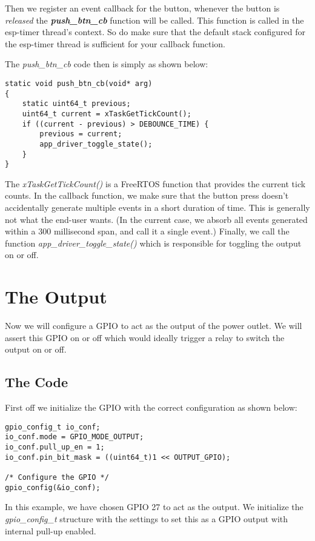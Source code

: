 \documentclass[main.tex]{subfiles}
\begin{document}
Then we register an event callback for the button, whenever the button is \textit{released} the \textit{\textbf{push\_btn\_cb}} function will be called. This function is called in the esp-timer thread's context. So do make sure that the default stack configured for the esp-timer thread is sufficient for your callback function.

The \textit{push\_btn\_cb} code then is simply as shown below:
\begin{verbatim}
static void push_btn_cb(void* arg)
{
    static uint64_t previous;
    uint64_t current = xTaskGetTickCount();
    if ((current - previous) > DEBOUNCE_TIME) {
        previous = current;
        app_driver_toggle_state();
    }
}
\end{verbatim}

The \textit{xTaskGetTickCount()} is a FreeRTOS function that provides the current tick counts. In the callback function, we make sure that the button press doesn't accidentally generate multiple events in a short duration of time. This is generally not what the end-user wants. (In the current case, we absorb all events generated within a 300 millisecond span, and call it a single event.)
Finally, we call the function \textit{app\_driver\_toggle\_state()} which is responsible for toggling the output on or off.

\section{The Output}
Now we will configure a GPIO to act as the output of the power outlet. We will assert this GPIO on or off which would ideally trigger a relay to switch the output on or off.

\subsection{The Code}\label{sec:relay}
First off we initialize the GPIO with the correct configuration as shown below:

\begin{verbatim}
gpio_config_t io_conf;
io_conf.mode = GPIO_MODE_OUTPUT;
io_conf.pull_up_en = 1;
io_conf.pin_bit_mask = ((uint64_t)1 << OUTPUT_GPIO);

/* Configure the GPIO */
gpio_config(&io_conf);

\end{verbatim}

In this example, we have chosen GPIO 27 to act as the output. We initialize the \textit{gpio\_config\_t} structure with the settings to set this as a GPIO output with internal pull-up enabled.
\end{document}
